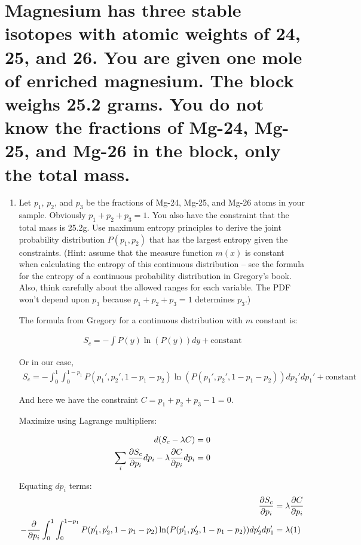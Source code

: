 \section{Magnesium has three stable isotopes with atomic weights of 24, 25, and 26. You are given one mole of enriched magnesium. The block weighs 25.2 grams. You do not know the fractions of Mg-24, Mg-25, and Mg-26 in the block, only the total mass.}

\begin{enumerate}[label=\textbf{\Alph*}.]
    \item Let $p_1$, $p_2$, and $p_3$ be the fractions of Mg-24, Mg-25, and Mg-26 atoms in your sample. Obviously $p_1+p_2+p_3=1$. You also have the constraint that the total mass is 25.2g. Use maximum entropy principles to derive the joint probability distribution $P(p_1,p_2)$ that has the largest entropy given the constraints. (Hint: assume that the measure function $m(x)$ is constant when calculating the entropy of this continuous distribution -- see the formula for the entropy of a continuous probability distribution in Gregory's book. Also, think carefully about the allowed ranges for each variable. The PDF won't depend upon $p_3$ because $p_1+p_2+p_3=1$ determines $p_3$.)

    The formula from Gregory for a continuous distribution with $m$ constant is:

    \begin{align*}
        S_c = -\int P(y) \ln(P(y)) dy + \text{constant}
    \end{align*}

    Or in our case,
    \begin{align*}
        S_c = -\int_0^1 \int_0^{1-p_1} P(p_1', p_2', 1-p_1-p_2) \ln(P(p_1', p_2', 1-p_1-p_2)) dp_2' dp_1' + \text{constant}
    \end{align*}

    And here we have the constraint $C = p_1+p_2+p_3 - 1 = 0$.

    Maximize using Lagrange multipliers:

    \begin{align*}
        d(S_c - \lambda C) &= 0 \\
        \sum_i \frac{\partial S_c}{\partial p_i} dp_i - \lambda \frac{\partial C}{\partial p_i} dp_i &= 0 \\
    \end{align*}

    Equating $dp_i$ terms:
    \begin{align*}
        \frac{\partial S_c}{\partial p_i} &= \lambda \frac{\partial C}{\partial p_i} \\
        -\frac{\partial}{\partial p_i} \int_0^1 \int_0^{1-p_1} P(p_1', p_2', 1-p_1-p_2) \ln(P(p_1', p_2', 1-p_1-p_2)) dp_2' dp_1' &= \lambda (1) \\
    \end{align*}


\end{enumerate}
